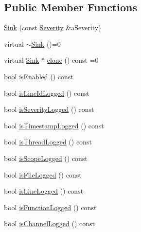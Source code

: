 \subsection*{Public Member Functions}
\begin{DoxyCompactItemize}
\item 
\hyperlink{classostk_1_1core_1_1logger_1_1sinks_1_1_sink_ada8f8e327dbc3776096d5d6fc9a0f0d5}{Sink} (const \hyperlink{namespaceostk_1_1core_1_1logger_a52d02954e094391f067befffe7f3cae9}{Severity} \&a\+Severity)
\item 
virtual \hyperlink{classostk_1_1core_1_1logger_1_1sinks_1_1_sink_a9b7fa855f7463981958c4c6c55bd9096}{$\sim$\+Sink} ()=0
\item 
virtual \hyperlink{classostk_1_1core_1_1logger_1_1sinks_1_1_sink}{Sink} $\ast$ \hyperlink{classostk_1_1core_1_1logger_1_1sinks_1_1_sink_a0e6b41f9b4626b5229370f71bd27be32}{clone} () const =0
\item 
bool \hyperlink{classostk_1_1core_1_1logger_1_1sinks_1_1_sink_ab0f84d1b7492172f86ce6b6965d1ec06}{is\+Enabled} () const
\item 
bool \hyperlink{classostk_1_1core_1_1logger_1_1sinks_1_1_sink_acc00e2ba3b9bc7643cf6219fae51dccc}{is\+Line\+Id\+Logged} () const
\item 
bool \hyperlink{classostk_1_1core_1_1logger_1_1sinks_1_1_sink_a3589e31f6b53bbec59d224cedafe5e31}{is\+Severity\+Logged} () const
\item 
bool \hyperlink{classostk_1_1core_1_1logger_1_1sinks_1_1_sink_ad811def520afbde684ed5c370923bbde}{is\+Timestamp\+Logged} () const
\item 
bool \hyperlink{classostk_1_1core_1_1logger_1_1sinks_1_1_sink_a635805c31e3a9b39c0c812ae8c122722}{is\+Thread\+Logged} () const
\item 
bool \hyperlink{classostk_1_1core_1_1logger_1_1sinks_1_1_sink_aea22f037f19aa1b8582aa7c4d508c409}{is\+Scope\+Logged} () const
\item 
bool \hyperlink{classostk_1_1core_1_1logger_1_1sinks_1_1_sink_af747351b5769b05e566000503ace7c6b}{is\+File\+Logged} () const
\item 
bool \hyperlink{classostk_1_1core_1_1logger_1_1sinks_1_1_sink_a70376798333269bf550f3f2b010f30fd}{is\+Line\+Logged} () const
\item 
bool \hyperlink{classostk_1_1core_1_1logger_1_1sinks_1_1_sink_ada08c6affa847f0276a27b6f394b6b4f}{is\+Function\+Logged} () const
\item 
bool \hyperlink{classostk_1_1core_1_1logger_1_1sinks_1_1_sink_aab319e29565fc6d5cf800a6155e8bc75}{is\+Channel\+Logged} () const

\end{DoxyCompactItemize}
